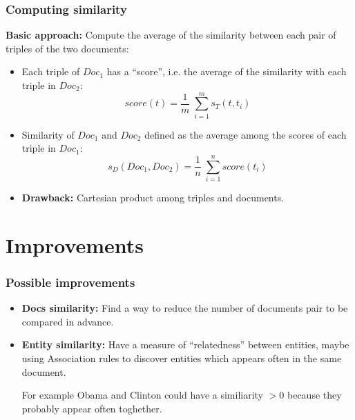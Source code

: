 \documentclass{beamer}
\begin{document}
\begin{frame}
\frametitle{Computing similarity}
{\bf Basic approach:} Compute the average of the similarity between
each pair of triples of the two documents:
\begin{itemize}
\item Each triple of $Doc_{1}$ has a ``score'', i.e. the average of the
  similarity with each triple in $Doc_{2}$:
$$
score (t) = \frac{1}{m} \; \sum^{m}_{i = 1} s_{T} (t, t_{i})
$$
\item Similarity of $Doc_{1}$ and $Doc_{2}$ defined as the average among the
  scores of each triple in $Doc_{1}$:
$$
s_{D} (Doc_{1}, Doc_{2}) = \frac{1}{n} \; \sum^{n}_{i = 1} score (t_{i})
$$
\item {{\bf Drawback:}} Cartesian product among triples and documents.
\end{itemize}
\end{frame}

\section{Improvements}
\begin{frame}
\frametitle{Possible improvements}
\begin{itemize}
\item{{\bf Docs similarity:}} Find a way to reduce the number of
  documents pair to be compared in advance.
\item{{\bf Entity similarity:}} Have a measure of ``relatedness''
  between entities, maybe using Association rules to discover entities
  which appears often in the same document.

  For example Obama and Clinton could have a similiarity $> 0$ because
  they probably appear often toghether.

\end{itemize}
\end{frame}
\end{document}
